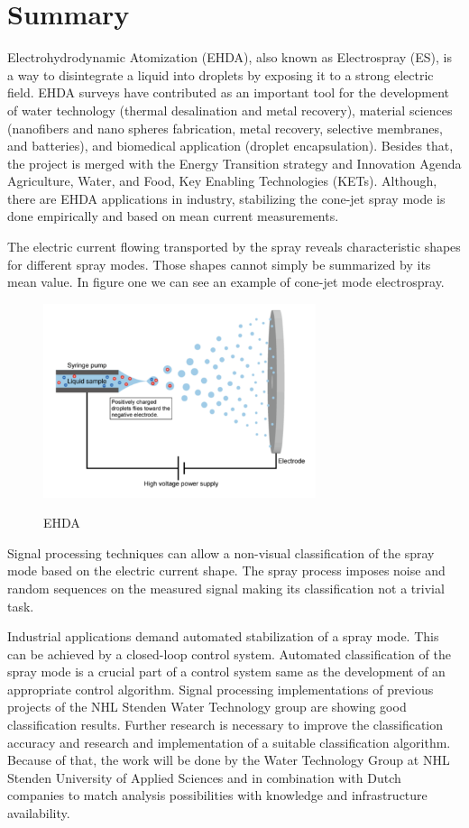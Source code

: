 \section{Summary}

        Electrohydrodynamic Atomization (EHDA), also known as Electrospray (ES), is a way to disintegrate a liquid into droplets by exposing it to a strong electric field.
EHDA surveys have contributed as an important tool for the development of water technology (thermal desalination and metal recovery), material sciences (nanofibers and nano spheres fabrication, metal recovery, selective membranes, and batteries), and biomedical application (droplet encapsulation).
Besides that, the project is merged with the Energy Transition strategy and Innovation Agenda Agriculture, Water, and Food, Key Enabling Technologies (KETs). 
Although, there are EHDA applications in industry, stabilizing the cone-jet spray mode is done empirically and based on mean current measurements. 

The electric current flowing transported by the spray reveals characteristic shapes for different spray modes.
Those shapes cannot simply be summarized by its mean value. In figure one we can see an example of cone-jet mode electrospray.

\begin{figure}[H]
    \center
    \includegraphics[width=8cm]{images/electrospray.png}
    \label{img1}
    \caption{EHDA}
\end{figure}

Signal processing techniques can allow a non-visual classification of the spray mode based on the electric current shape.
The spray process imposes noise and random sequences on the measured signal making its classification not a trivial task. 

Industrial applications demand automated stabilization of a spray mode.
This can be achieved by a closed-loop control system.
Automated classification of the spray mode is a crucial part of a control system same as the development of an appropriate control algorithm. 
Signal processing implementations of previous projects of the NHL Stenden Water Technology group are showing good classification results.
Further research is necessary to improve the classification accuracy and research and implementation of a suitable classification algorithm. 
Because of that, the work will be done by the Water Technology Group at NHL Stenden University of Applied Sciences and in combination with Dutch companies to match analysis possibilities with knowledge and infrastructure availability.



